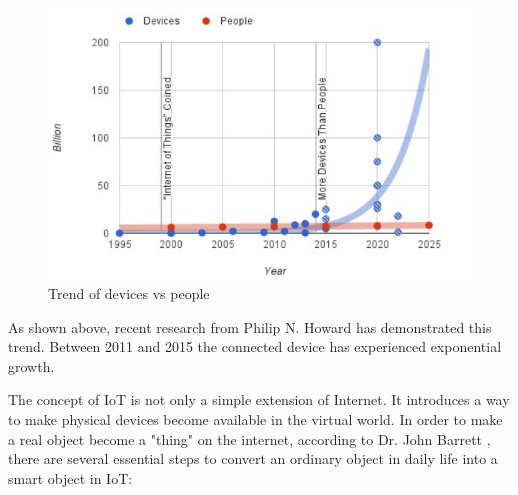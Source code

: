\documentclass{Nan_Thesis}
\begin{document}
\begin{figure}[h]
  \centering 
      \includegraphics[scale=1]{pic/IoTtrend.png} 
  \caption{Trend of devices vs people \cite{philip2015iottrend}}
\end{figure}

As shown above, recent research from Philip N. Howard \cite{philip2015iottrend} has demonstrated this trend. Between 2011 and 2015 the connected device has experienced exponential growth. 

The concept of IoT is not only a simple extension of Internet. It introduces a way to make physical devices become available in the virtual world. In order to make a real object become a "thing" on the internet, according to Dr. John Barrett \cite{barrett2012IoT}, there are several essential steps to convert an ordinary object in daily life into a smart object in IoT:
\end{document}
